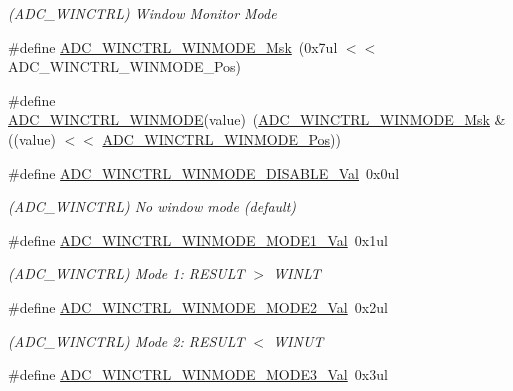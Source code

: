 \begin{DoxyCompactItemize}
\begin{DoxyCompactList}\small\item\em (A\+D\+C\+\_\+\+W\+I\+N\+C\+T\+RL) Window Monitor Mode \end{DoxyCompactList}\item 
\#define \mbox{\hyperlink{group___s_a_m_d21___a_d_c_ga245ed425eeaf42951ac8868ac9409e21}{A\+D\+C\+\_\+\+W\+I\+N\+C\+T\+R\+L\+\_\+\+W\+I\+N\+M\+O\+D\+E\+\_\+\+Msk}}~(0x7ul $<$$<$ A\+D\+C\+\_\+\+W\+I\+N\+C\+T\+R\+L\+\_\+\+W\+I\+N\+M\+O\+D\+E\+\_\+\+Pos)
\item 
\#define \mbox{\hyperlink{group___s_a_m_d21___a_d_c_ga44f097e60b7ac4aabf3fdd8832c945e4}{A\+D\+C\+\_\+\+W\+I\+N\+C\+T\+R\+L\+\_\+\+W\+I\+N\+M\+O\+DE}}(value)~(\mbox{\hyperlink{group___s_a_m_d21___a_d_c_ga245ed425eeaf42951ac8868ac9409e21}{A\+D\+C\+\_\+\+W\+I\+N\+C\+T\+R\+L\+\_\+\+W\+I\+N\+M\+O\+D\+E\+\_\+\+Msk}} \& ((value) $<$$<$ \mbox{\hyperlink{group___s_a_m_d21___a_d_c_ga5c7a53123f9ec54b3295fc3850240fff}{A\+D\+C\+\_\+\+W\+I\+N\+C\+T\+R\+L\+\_\+\+W\+I\+N\+M\+O\+D\+E\+\_\+\+Pos}}))
\item 
\#define \mbox{\hyperlink{group___s_a_m_d21___a_d_c_gad426ea343c795919514df5154a43ad1c}{A\+D\+C\+\_\+\+W\+I\+N\+C\+T\+R\+L\+\_\+\+W\+I\+N\+M\+O\+D\+E\+\_\+\+D\+I\+S\+A\+B\+L\+E\+\_\+\+Val}}~0x0ul
\begin{DoxyCompactList}\small\item\em (A\+D\+C\+\_\+\+W\+I\+N\+C\+T\+RL) No window mode (default) \end{DoxyCompactList}\item 
\#define \mbox{\hyperlink{group___s_a_m_d21___a_d_c_ga3e70ea47133ebb9e04cfaf0b6a17a7ed}{A\+D\+C\+\_\+\+W\+I\+N\+C\+T\+R\+L\+\_\+\+W\+I\+N\+M\+O\+D\+E\+\_\+\+M\+O\+D\+E1\+\_\+\+Val}}~0x1ul
\begin{DoxyCompactList}\small\item\em (A\+D\+C\+\_\+\+W\+I\+N\+C\+T\+RL) Mode 1\+: R\+E\+S\+U\+LT $>$ W\+I\+N\+LT \end{DoxyCompactList}\item 
\#define \mbox{\hyperlink{group___s_a_m_d21___a_d_c_gad026ac699f643c60645393016b3bf177}{A\+D\+C\+\_\+\+W\+I\+N\+C\+T\+R\+L\+\_\+\+W\+I\+N\+M\+O\+D\+E\+\_\+\+M\+O\+D\+E2\+\_\+\+Val}}~0x2ul
\begin{DoxyCompactList}\small\item\em (A\+D\+C\+\_\+\+W\+I\+N\+C\+T\+RL) Mode 2\+: R\+E\+S\+U\+LT $<$ W\+I\+N\+UT \end{DoxyCompactList}\item 
\#define \mbox{\hyperlink{group___s_a_m_d21___a_d_c_ga607c7268facab50bcf70220e783fdd48}{A\+D\+C\+\_\+\+W\+I\+N\+C\+T\+R\+L\+\_\+\+W\+I\+N\+M\+O\+D\+E\+\_\+\+M\+O\+D\+E3\+\_\+\+Val}}~0x3ul

\end{DoxyCompactItemize}
